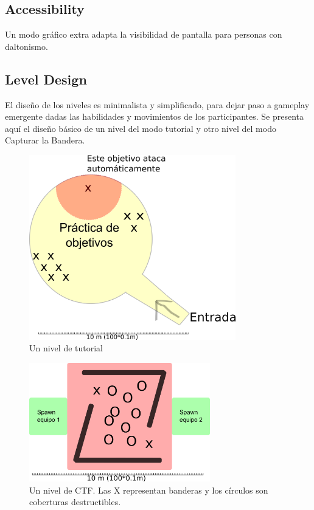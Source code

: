 \documentclass[12pt]{report}
\begin{document}
\subsection{Accessibility}

Un modo gráfico extra adapta la visibilidad de pantalla para personas con daltonismo.

\subsection{Level Design}

El diseño de los niveles es minimalista y simplificado, para dejar paso a gameplay emergente dadas las habilidades y movimientos de los participantes. Se presenta aquí el diseño básico de un nivel del modo tutorial y otro nivel del modo Capturar la Bandera.

\begin{figure}[H]
    \centering
    \includegraphics[width=0.8\textwidth]{tutorial}
    \caption{Un nivel de tutorial}
\end{figure}


\begin{figure}[H]
    \centering
    \includegraphics[width=0.7\textwidth]{flags}
    \caption{Un nivel de CTF. Las X representan banderas y los círculos son coberturas destructibles.}
\end{figure}
\end{document}
